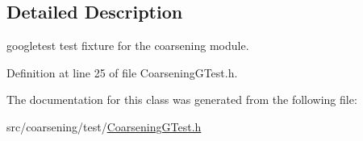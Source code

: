 \subsection{Detailed Description}
googletest test fixture for the coarsening module. 

Definition at line 25 of file Coarsening\-G\-Test.\-h.



The documentation for this class was generated from the following file\-:\begin{DoxyCompactItemize}
\item 
src/coarsening/test/\hyperlink{_coarsening_g_test_8h}{Coarsening\-G\-Test.\-h}\end{DoxyCompactItemize}
